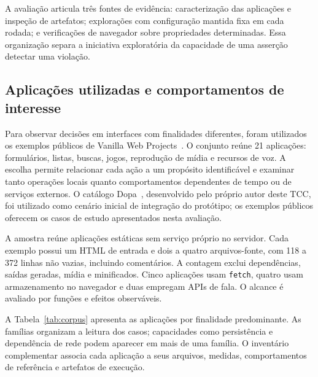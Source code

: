 \documentclass[12pt]{article}
\begin{document}
A avaliação articula três fontes de evidência: caracterização das aplicações e inspeção de artefatos; explorações com configuração mantida fixa em cada rodada; e verificações de navegador sobre propriedades determinadas. Essa organização separa a iniciativa exploratória da capacidade de uma asserção detectar uma violação.

\subsection{Aplicações utilizadas e comportamentos de interesse}
Para observar decisões em interfaces com finalidades diferentes, foram utilizados os exemplos públicos de Vanilla Web Projects~\cite{traversy2026vanilla}. O conjunto reúne 21 aplicações: formulários, listas, buscas, jogos, reprodução de mídia e recursos de voz. A escolha permite relacionar cada ação a um propósito identificável e examinar tanto operações locais quanto comportamentos dependentes de tempo ou de serviços externos. O catálogo Dopa~\cite{pieceofhell2026dopa}, desenvolvido pelo próprio autor deste TCC, foi utilizado como cenário inicial de integração do protótipo; os exemplos públicos oferecem os casos de estudo apresentados nesta avaliação.

A amostra reúne aplicações estáticas sem serviço próprio no servidor. Cada exemplo possui um HTML de entrada e dois a quatro arquivos-fonte, com 118 a 372 linhas não vazias, incluindo comentários. A contagem exclui dependências, saídas geradas, mídia e minificados. Cinco aplicações usam \texttt{fetch}, quatro usam armazenamento no navegador e duas empregam APIs de fala. O alcance é avaliado por funções e efeitos observáveis.

A Tabela~\ref{tab:corpus} apresenta as aplicações por finalidade predominante. As famílias organizam a leitura dos casos; capacidades como persistência e dependência de rede podem aparecer em mais de uma família. O inventário complementar associa cada aplicação a seus arquivos, medidas, comportamentos de referência e artefatos de execução.
\end{document}
